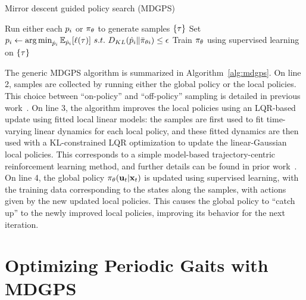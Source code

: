 \setlength{\textfloatsep}{12pt}
\begin{algorithm}[tb]
    \caption{Mirror descent guided policy search (MDGPS)}
    \label{alg:mdgps}
    \begin{algorithmic}[1]
            \STATE Run either each $p_i$ or $\pi_{\theta}$ to
            generate samples $\{\tau\}$
            \STATE Set
            $p_i\leftarrow\operatorname*{arg\,min}_{\hat{p}_i}\mathbb{E}_{\hat{p}_i}[\ell(\tau)]~s.t.~D_{KL}(\hat{p}_i\|\bar{\pi}_{\theta{i}})\leq\epsilon$
            \STATE Train $\pi_{\theta}$ using supervised learning on
            $\{\tau\}$
        \ENDFOR
    \end{algorithmic}
\end{algorithm}

The generic MDGPS algorithm is summarized in Algorithm~\ref{alg:mdgps}. On line
2, samples are collected by running either the global policy or the local
policies. This choice between ``on-policy'' and ``off-policy'' sampling is
detailed in previous work~\cite{ml-gpsam-16}. On line 3, the algorithm improves
the local policies using an LQR-based update using fitted local linear models:
the samples are first used to fit time-varying linear dynamics for each local
policy, and these fitted dynamics are then used with a KL-constrained LQR
optimization to update the linear-Gaussian local policies. This corresponds to a
simple model-based trajectory-centric reinforcement learning method, and further
details can be found in prior work~\cite{la-lnnpg-14}. On line 4, the global
policy $\pi_\theta(\mathbf{u}_t|\mathbf{x}_t)$ is updated using supervised learning, with the
training data corresponding to the states along the samples, with actions given
by the new updated local policies. This causes the global policy to ``catch up''
to the newly improved local policies, improving its behavior for the next
iteration.


\section{Optimizing Periodic Gaits with MDGPS}
\label{sec:chains}

